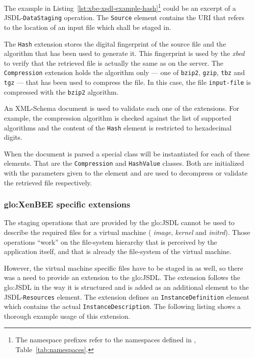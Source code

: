 The    example   in   Listing~\ref{lst:xbe-xsdl-example-hash}\footnote{The
  namespace    prefixes    refer   to    the    namespaces   defined    in
  \emph{},       Table~\ref{tab:namespaces}.}
could  be  an  excerpt  of  a  JSDL-\texttt{DataStaging}  operation.   The
\texttt{Source} element contains the URI that refers to the location of an
input file which shall be staged in.

The \texttt{Hash}  extension stores the digital fingerprint  of the source
file and the algorithm that has been used to generate it. This fingerprint
is used by  the \emph{xbed} to verify that the  retrieved file is actually
the same  as on the  server. The \texttt{Compression} extension  holds the
algorithm only --- one  of \texttt{bzip2}, \texttt{gzip}, \texttt{tbz} and
\texttt{tgz} ---  that has been used  to compress the file.  In this case,
the  file  \texttt{input-file}   is  compressed  with  the  \texttt{bzip2}
algorithm.

An XML-Schema document is used to validate each one of the extensions. For
example,  the  compression  algorithm  is  checked  against  the  list  of
supported  algorithms and  the  content of  the  \texttt{Hash} element  is
restricted to hexadecimal digits.

\medskip

When the document is parsed a  special class will be instantiated for each
of    these   elements.    That    are   the    \texttt{Compression}   and
\texttt{HashValue} classes. Both are initialized with the parameters given
to the element  and are used to decompress or  validate the retrieved file
respectively.

\subsubsection{\gls{glo:XenBEE} specific extensions}

The staging operations  that are provided by the  \gls{glo:JSDL} cannot be
used  to  describe   the  required  files  for  a   virtual  machine  (\ie
\emph{image}, \emph{kernel} and  \emph{initrd}). Those operations ``work''
on the file-system hierarchy that  is perceived by the application itself,
and that is already the file-system of the virtual machine.

However, the virtual machine specific files  have to be staged in as well,
so there  was a need  to provide an  extension to the  \gls{glo:JSDL}. The
extension follows  the \gls{glo:JSDL} in the  way it is  structured and is
added as an additional element to the JSDL-\texttt{Resources} element. The
extension  defines an  \texttt{InstanceDefinition} element  which contains
the  actual \texttt{InstanceDescription}.  The  following listing  shows a
thorough example usage of this extension.

